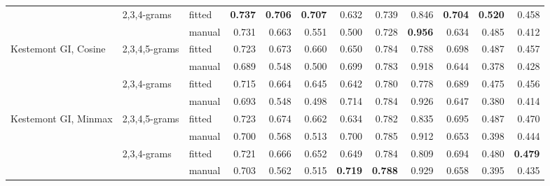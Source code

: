 \documentclass[
    hf
]{ceurart}
\begin{document}
\begin{table}
\begin{adjustbox}{max width=\textwidth}
\begin{tabular}{lllrrrrrrrrr}
                                                      & \multirow[c]{2}{*}{ 2,3,4-grams }   & fitted  & \textbf{0.737} & \textbf{0.706} & \textbf{0.707} & 0.632          & 0.739          & 0.846          & \textbf{0.704} & \textbf{0.520} & 0.458          \\
                                                      &                                     & manual  & 0.731          & 0.663          & 0.551          & 0.500          & 0.728          & \textbf{0.956} & 0.634          & 0.485          & 0.412          \\
            \multirow[c]{4}{*}{Kestemont GI, Cosine } & \multirow[c]{2}{*}{ 2,3,4,5-grams } & fitted  & 0.723          & 0.673          & 0.660          & 0.650          & 0.784          & 0.788          & 0.698          & 0.487          & 0.457          \\
                                                      &                                     & manual  & 0.689          & 0.548          & 0.500          & 0.699          & 0.783          & 0.918          & 0.644          & 0.378          & 0.428          \\
                                                      & \multirow[c]{2}{*}{ 2,3,4-grams }   & fitted  & 0.715          & 0.664          & 0.645          & 0.642          & 0.780          & 0.778          & 0.689          & 0.475          & 0.456          \\
                                                      &                                     & manual  & 0.693          & 0.548          & 0.498          & 0.714          & 0.784          & 0.926          & 0.647          & 0.380          & 0.414          \\
            \multirow[c]{4}{*}{Kestemont GI, Minmax } & \multirow[c]{2}{*}{ 2,3,4,5-grams } & fitted  & 0.723          & 0.674          & 0.662          & 0.634          & 0.782          & 0.835          & 0.695          & 0.487          & 0.470          \\
                                                      &                                     & manual  & 0.700          & 0.568          & 0.513          & 0.700          & 0.785          & 0.912          & 0.653          & 0.398          & 0.444          \\
                                                      & \multirow[c]{2}{*}{ 2,3,4-grams }   & fitted  & 0.721          & 0.666          & 0.652          & 0.649          & 0.784          & 0.809          & 0.694          & 0.480          & \textbf{0.479} \\
                                                      &                                     & manual  & 0.703          & 0.562          & 0.515          & \textbf{0.719} & \textbf{0.788} & 0.929          & 0.658          & 0.395          & 0.435          \\
            \bottomrule
        \end{tabular}
    \end{adjustbox}
\end{table}
\end{document}
